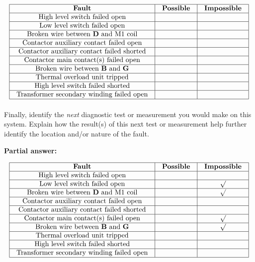$$\vbox{\offinterlineskip
\halign{\strut
\vrule \quad\hfil # \ \hfil & 
\vrule \quad\hfil # \ \hfil & 
\vrule \quad\hfil # \ \hfil \vrule \cr
\noalign{\hrule}
%
{\bf Fault} & {\bf Possible} & {\bf Impossible} \cr
%
\noalign{\hrule}
%
High level switch failed open &  &  \cr
%
\noalign{\hrule}
%
Low level switch failed open &  &  \cr
%
\noalign{\hrule}
%
Broken wire between {\bf D} and M1 coil &  &  \cr
%
\noalign{\hrule}
%
Contactor auxiliary contact failed open &  &  \cr
%
\noalign{\hrule}
%
Contactor auxiliary contact failed shorted &  &  \cr
%
\noalign{\hrule}
%
Contactor main contact(s) failed open &  &  \cr
%
\noalign{\hrule}
%
Broken wire between {\bf B} and {\bf G} &  &  \cr
%
\noalign{\hrule}
%
Thermal overload unit tripped &  &  \cr
%
\noalign{\hrule}
%
High level switch failed shorted &  &  \cr
%
\noalign{\hrule}
%
Transformer secondary winding failed open &  &  \cr
%
\noalign{\hrule}
} %
}$$ %

Finally, identify the {\it next} diagnostic test or measurement you would make on this system.  Explain how the result(s) of this next test or measurement help further identify the location and/or nature of the fault.







\noindent
{\bf Partial answer:}


$$\vbox{\offinterlineskip
\halign{\strut
\vrule \quad\hfil # \ \hfil & 
\vrule \quad\hfil # \ \hfil & 
\vrule \quad\hfil # \ \hfil \vrule \cr
\noalign{\hrule}
%
{\bf Fault} & {\bf Possible} & {\bf Impossible} \cr
%
\noalign{\hrule}
%
High level switch failed open &  &  \cr
%
\noalign{\hrule}
%
Low level switch failed open &  & $\surd$ \cr
%
\noalign{\hrule}
%
Broken wire between {\bf D} and M1 coil &  & $\surd$ \cr
%
\noalign{\hrule}
%
Contactor auxiliary contact failed open &  &  \cr
%
\noalign{\hrule}
%
Contactor auxiliary contact failed shorted &  &  \cr
%
\noalign{\hrule}
%
Contactor main contact(s) failed open &  & $\surd$ \cr
%
\noalign{\hrule}
%
Broken wire between {\bf B} and {\bf G} &  & $\surd$ \cr
%
\noalign{\hrule}
%
Thermal overload unit tripped &  &  \cr
%
\noalign{\hrule}
%
High level switch failed shorted &  &  \cr
%
\noalign{\hrule}
%
Transformer secondary winding failed open &  &  \cr
%
\noalign{\hrule}
} %
}$$ %


